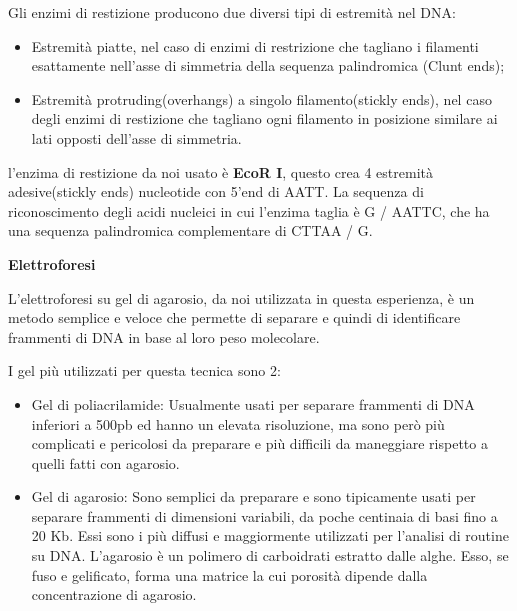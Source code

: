 Gli enzimi di restizione producono due diversi tipi di estremità nel DNA:
\begin{itemize}

	\item Estremità piatte, nel caso di enzimi di restrizione che tagliano i filamenti esattamente
	nell'asse di simmetria della sequenza palindromica (Clunt ends);
	\item Estremità protruding(overhangs) a singolo filamento(stickly ends), nel caso degli enzimi di
	restizione che tagliano ogni filamento in posizione similare ai lati opposti dell'asse di simmetria.

\end{itemize}

l'enzima di restizione da noi usato è \textbf{EcoR I}, questo crea 4 estremità
adesive(stickly ends) nucleotide con  5'end  di AATT. La sequenza di riconoscimento
degli acidi nucleici in cui l'enzima taglia è G / ​​AATTC, che ha una sequenza
palindromica complementare di CTTAA / G.

\vspace{0.5cm}


\textbf{Elettroforesi }

\vspace{0.3cm}



L'elettroforesi su gel di agarosio, da noi utilizzata in questa esperienza, è un
metodo semplice e veloce che permette di separare e quindi di identificare
frammenti di DNA in base al loro peso molecolare.

I gel più utilizzati per questa tecnica sono 2:
\begin{itemize}

	\item{Gel di poliacrilamide: } Usualmente usati per separare frammenti di
	DNA inferiori a 500pb ed hanno un elevata risoluzione, ma sono però più complicati
	e pericolosi da preparare e più difficili da maneggiare rispetto a quelli fatti con agarosio.

	\item{Gel di agarosio: } Sono semplici da preparare e sono tipicamente usati per
	separare frammenti di dimensioni variabili, da poche centinaia di basi fino a 20 Kb.
	Essi sono i più diffusi e maggiormente utilizzati per l'analisi di routine su DNA.
	L'agarosio è un polimero di carboidrati estratto dalle alghe.
	Esso, se fuso e gelificato, forma una matrice la cui porosità dipende dalla concentrazione di agarosio.

\end{itemize}


